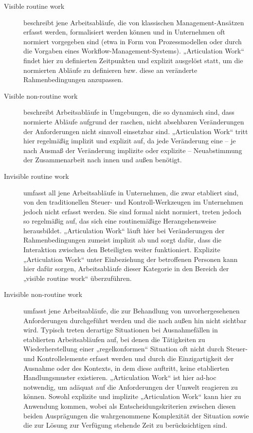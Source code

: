 \begin{description}
	\item[Visible routine work] beschreibt jene Arbeitsabläufe, die von klassischen Management-Ansätzen erfasst werden, formalisiert werden können und in Unternehmen oft normiert vorgegeben sind (etwa in Form von Prozessmodellen oder durch die Vorgaben eines Workflow-Management-Systems). „Articulation Work“ findet hier zu definierten Zeitpunkten und explizit ausgelöst statt, um die normierten Abläufe zu definieren bzw. diese an veränderte Rahmenbedingungen anzupassen. 
	\item[Visible non-routine work] beschreibt Arbeitsabläufe in Umgebungen, die so dynamisch sind, dass normierte Abläufe aufgrund der raschen, nicht absehbaren Veränderungen der Anforderungen nicht sinnvoll einsetzbar sind. „Articulation Work“ tritt hier regelmäßig implizit und explizit auf, da jede Veränderung eine -- je nach Ausmaß der Veränderung implizite oder explizite -- Neuabstimmung der Zusammenarbeit nach innen und außen benötigt.
	\item[Invisible routine work] umfasst all jene Arbeitsabläufe in Unternehmen, die zwar etabliert sind, von den traditionellen Steuer- und Kontroll-Werkzeugen im Unternehmen jedoch nicht erfasst werden. Sie sind formal nicht normiert, treten jedoch so regelmäßig auf, das sich eine routinemäßige Herangehensweise herausbildet. „Articulation Work“ läuft hier bei Veränderungen der Rahmenbedingungen zumeist implizit ab und sorgt dafür, dass die Interaktion zwischen den Beteiligten weiter funktioniert. Explizite „Articulation Work“ unter Einbeziehung der betroffenen Personen kann hier dafür sorgen, Arbeitsabläufe dieser Kategorie in den Bereich der „visible routine work“ überzuführen.
	\item[Invisible non-routine work] umfasst jene Arbeitsabläufe, die zur Behandlung von unvorhergesehenen Anforderungen durchgeführt werden und die nach außen hin nicht sichtbar wird. Typisch treten derartige Situationen bei Ausnahmefällen in etablierten Arbeitsabläufen auf, bei denen die Tätigkeiten zu Wiederherstellung einer „regelkonformen“ Situation oft nicht durch Steuer- und Kontrollelemente erfasst werden und durch die Einzigartigkeit der Ausnahme oder des Kontexts, in dem diese auftritt, keine etablierten Handlungsmuster existieren. „Articulation Work“ ist hier ad-hoc notwendig, um adäquat auf die Anforderungen der Umwelt reagieren zu können. Sowohl explizite und implizite „Articulation Work“ kann hier zu Anwendung kommen, wobei als Entscheidungskriterien zwischen diesen beiden Ausprägungen die wahrgenommene Komplexität der Situation sowie die zur Lösung zur Verfügung stehende Zeit zu berücksichtigen sind.
\end{description}

